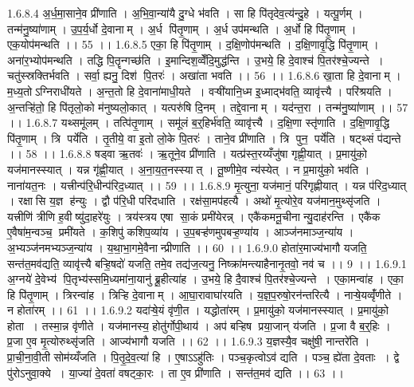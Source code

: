 1.6.8.4
अ॒र्ध॒मा॒साने॒व प्री॑णाति । अ॒भि॒वा॒न्या॑यै दु॒ग्धे भ॑वति । सा हि पि॑तृदेव॒त्य॑न्दु॒हे । यत्पू॒र्णम् । तन्म॑नु॒ष्या॑णाम् । उ॒प॒र्य॒र्धो दे॒वानाम् । अ॒र्ध पि॑तृ॒णाम् । अ॒र्ध उप॑मन्थति । अ॒र्धो हि पि॑तृ॒णाम् । एक॒योप॑मन्थति ।। 55 ।।
1.6.8.5
एका॒ हि पि॑तृ॒णाम् । द॒क्षि॒णोप॑मन्थति । द॒क्षि॒णावृ॒द्धि पि॑तृ॒णाम् । अना॑र॒भ्योप॑मन्थति । तद्धि पि॒तॄन्गच्छ॑ति । इ॒मान्दिश॒व्वेँदि॒मुद्ध॑न्ति । उ॒भये॒ हि दे॒वाश्च॑ पि॒तर॑श्चे॒ज्यन्ते । चतु॑स्स्रक्तिर्भवति । सर्वा॒ ह्यनु॒ दिश॑ पि॒तरः॑ । अखा॑ता भवति ।। 56 ।।
1.6.8.6
खा॒ता हि दे॒वानाम् । म॒ध्य॒तोऽग्निराधी॑यते । अ॒न्त॒तो हि दे॒वाना॑माधी॒यते । वऱ्षी॑यानि॒ध्म इ॒ध्माद्भ॑वति॒ व्यावृ॑त्त्यै । परि॑श्रयति । अ॒न्तऱ्हि॑तो॒ हि पि॑तृलो॒को म॑नुष्यलो॒कात् । यत्परु॑षि दि॒नम् । तद्दे॒वानाम् । यद॑न्त॒रा । तन्म॑नु॒ष्या॑णाम् ।। 57 ।।
1.6.8.7
यथ्समू॑लम् । तत्पि॑तृ॒णाम् । समू॑लं ब॒र्॒हिर्भ॑वति॒ व्यावृ॑त्त्यै । द॒क्षि॒णा स्तृ॑णाति । द॒क्षि॒णावृ॒द्धि पि॑तृ॒णाम् । त्रि पर्ये॑ति । तृ॒तीये॒ वा इ॒तो लो॒के पि॒तरः॑ । ताने॒व प्री॑णाति । त्रि पुन॒ पर्ये॑ति । षट्थ्सं प॑द्यन्ते ।। 58 ।।
1.6.8.8
षड्वा ऋ॒तवः॑ । ऋ॒तूने॒व प्री॑णाति । यत्प्र॑स्त॒रय्यँजु॑षा गृह्णी॒यात् । प्र॒मायु॑को॒ यज॑मानस्स्यात् । यन्न गृ॑ह्णी॒यात् । अ॒ना॒य॒त॒नस्स्यात् । तू॒ष्णीमे॒व न्य॑स्येत् । न प्र॒मायु॑को॒ भव॑ति । नाना॑यत॒नः । यत्त्रीन्प॑रि॒धीन्प॑रिद॒ध्यात् ।। 59 ।।
1.6.8.9
मृ॒त्युना॒ यज॑मानं॒ परि॑गृह्णीयात् । यन्न प॑रिद॒ध्यात् । रक्षा॑सि य॒ज्ञ ह॑न्युः । द्वौ प॑रि॒धी परि॑दधाति । रक्ष॑सा॒मप॑हत्यै । अथो॑ मृ॒त्योरे॒व यज॑मान॒मुथ्सृ॑जति । यत्त्रीणि॑ त्रीणि ह॒वीष्यु॑दा॒हरे॑युः । त्रय॑स्त्रय एषा सा॒कं प्रमी॑येरन्न् । एकै॑कमनू॒चीनान्यु॒दाह॑रन्ति । एकै॑क ए॒वैषा॑म॒न्वञ्च॒ प्रमी॑यते । क॒शिपु॑ कशिप॒व्या॑य । उ॒प॒बऱ्ह॑णमुपबऱ्ह॒ण्या॑य । आञ्ज॑नमाञ्ज॒न्या॑य । अ॒भ्यञ्ज॑नमभ्यञ्ज॒न्या॑य । य॒था॒भा॒गमे॒वैनान्प्रीणाति ।। 60 ।।
1.6.9.0
होता॑र॒माज्य॑भागौ यजति॒ सन्त॑त॒मव॑द्यति॒ व्यावृ॑त्त्यै बऱ्हि॒षदो॑ यजति॒ तमे॒व तद्य॑ज॒त्यनु॒ निष्क्रा॑मन्त्याहैनानृ॒तवो॒ नव॑ च ।। 9 ।।
1.6.9.1
अ॒ग्नये॑ दे॒वेभ्य॑ पि॒तृभ्य॑स्समि॒ध्यमा॑ना॒यानु॑ ब्रू॒हीत्या॑ह । उ॒भये॒ हि दै॒वाश्च॑ पि॒तर॑श्चे॒ज्यन्ते । एका॒मन्वा॑ह । एका॒ हि पि॑तृ॒णाम् । त्रिरन्वा॑ह । त्रिऱ्हि दे॒वानाम् । आ॒घा॒रावाघा॑रयति । य॒ज्ञ॒प॒रुषो॒रन॑न्तरित्यै । नाऱ्षे॒यव्वृँ॑णीते । न होता॑रम् ।। 61 ।।
1.6.9.2
यदा॑ऱ्षे॒यं वृ॑णी॒त । यद्धोता॑रम् । प्र॒मायु॑को॒ यज॑मानस्स्यात् । प्र॒मायु॑को॒ होता । तस्मा॒न्न वृ॑णीते । यज॑मानस्य॒ होतु॑र्गोपी॒थाय॑ । अप॑ बऱ्हिष प्रया॒जान् य॑जति । प्र॒जा वै ब॒र्॒हिः । प्र॒जा ए॒व मृ॒त्योरुथ्सृ॑जति । आज्य॑भागौ यजति ।। 62 ।।
1.6.9.3
य॒ज्ञस्यै॒व चक्षु॑षी॒ नान्तरे॑ति । प्रा॒ची॒ना॒वी॒ती सोम॑य्यँजति । पि॒तृ॒दे॒व॒त्या॑ हि । ए॒षाऽऽहु॑तिः । पञ्च॒कृत्वोऽव॑ द्यति । पञ्च॒ ह्ये॑ता दे॒वताः । द्वे पु॑रोऽनुवा॒क्ये । या॒ज्या॑ दे॒वता॑ वषट्का॒रः । ता ए॒व प्री॑णाति । सन्त॑त॒मव॑ द्यति ।। 63 ।।
